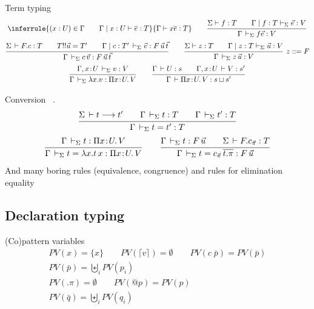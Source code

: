 \documentclass[acmlarge]{acmart}\settopmatter{}
\renewcommand{\|}{\mid}
\begin{document}
Term typing 
\begin{gather*}
\inferrule
  {(x:U)\in \Gamma \qquad \Gamma \mid x:U \vdash \overline{e}:T}
  {\Gamma \vdash x \overline{e} : T}
\qquad
\ru{\Sigma \vdash f : T \qquad
    \Gamma \mid f : T \vdash_\Sigma \vec e : V
   }{\Gamma \der_\Sigma f \vec e : V}
\\
\ru{\Sigma \der F.c : T \qquad
    T !! \vec u = T' \qquad
    \Gamma \mid c : T' \der_\Sigma \vec v : F \, \vec u \, \vec t
  }{\Gamma \der_\Sigma c\,\vec v : F\,\vec u\,\vec t}
\qquad
\ru{\Sigma \vdash z : T \qquad
    \Gamma \mid z : T \vdash_\Sigma \vec u : V
   }{\Gamma \der_\Sigma z \, \vec u : V} \ z ::= F
\\
\ru{\Gamma, x \of U \der_\Sigma v : V
  }{\Gamma \der_\Sigma \lambda x.v : \funT x U V}
\qquad
\ru{\Gamma \der U : s \qquad
    \Gamma, x \of U \der V : s'
  }{\Gamma \der \piT x U V : s \sqcup s'}
\end{gather*}


Conversion
\ .
\begin{gather*}
%
\ru{\Sigma \der t \red t' \qquad
    \Gamma \ders t : T \qquad
    \Gamma \ders t' : T
  }{\Gamma \ders t = t' : T}
\\
\ru{\Gamma \ders t : \funT x U V
  }{\Gamma \ders t = \lambda x. t\, x : \funT x U V}
\qquad
\ru{\Gamma \ders t : F\, \vec u \qquad
    \Sigma \der F.\cpi : T
  }{\Gamma \ders t = \cpi\,\overline{t .\pi} : F\,\vec u}
\\
\end{gather*}
And many boring rules (equivalence, congruence)
and rules for elimination equality


\subsection{Declaration typing}

(Co)pattern variables 
\begin{gather*}
PV(x) = \{ x \} \qquad PV (\lceil v \rceil) = \emptyset \qquad PV(c\; \bar{p}) = PV(\bar{p}) \\
PV(\bar{p}) = \biguplus_i PV(p_i) \\
PV(.\pi) = \emptyset \qquad PV(@p) = PV(p) \\
PV(\bar{q}) = \biguplus_i PV(q_i) \\
\end{gather*}
\end{document}
